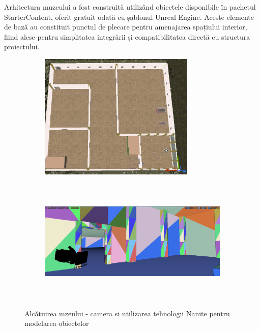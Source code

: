 Arhitectura muzeului a fost construită utilizând obiectele disponibile în pachetul StarterContent, oferit gratuit odată cu șablonul Unreal Engine. Aceste elemente de bază au constituit punctul de plecare pentru amenajarea spațiului interior, fiind alese pentru simplitatea integrării și compatibilitatea directă cu structura proiectului.
\begin{figure}[h!]
    \centering
    \begin{subfigure}{0.49\textwidth}
        \includegraphics[width=\linewidth, height=6cm]{continut/capitol3/figuri/scheme.png}
        \label{fig:Museum}
    \end{subfigure}
    \hfill
    \begin{subfigure}{0.49\textwidth}
        \includegraphics[width=\linewidth, height=6cm]{continut/capitol3/figuri/Screenshot 2025-03-03 135626.png}
        \label{fig:Museum}
    \end{subfigure}
    \caption{Alcătuirea mzeului - camera si utilizarea tehnologii Nanite pentru modelarea obiectelor}
\end{figure}


